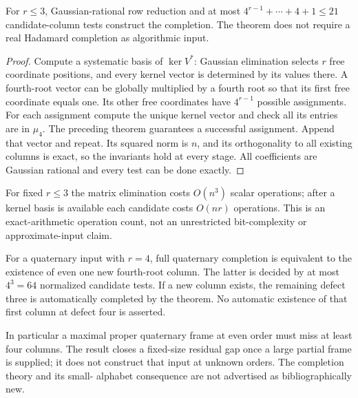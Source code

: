 \begin{theorem}
For $r\le3$, Gaussian-rational row reduction and at most
$4^{r-1}+\cdots+4+1\le21$ candidate-column tests construct the
completion. The theorem does not require a real Hadamard completion
as algorithmic input.
\end{theorem}
\begin{proof}
Compute a systematic basis of $\ker V^*$: Gaussian elimination
selects $r$ free coordinate positions, and every kernel vector is
determined by its values there. A fourth-root vector can be globally
multiplied by a fourth root so that its first free coordinate equals
one. Its other free coordinates have $4^{r-1}$ possible assignments.
For each assignment compute the unique kernel vector and check all
its entries are in $\mu_4$. The preceding theorem guarantees a
successful assignment. Append that vector and repeat. Its squared
norm is $n$, and its orthogonality to all existing columns is exact,
so the invariants hold at every stage. All coefficients are Gaussian
rational and every test can be done exactly.
\end{proof}
For fixed $r\le3$ the matrix elimination costs $O(n^3)$ scalar
operations; after a kernel basis is available each candidate costs
$O(nr)$ operations. This is an exact-arithmetic operation count,
not an unrestricted bit-complexity or approximate-input claim.

\begin{corollary}
For a quaternary input with $r=4$, full quaternary completion is
equivalent to the existence of even one new fourth-root column.
The latter is decided by at most $4^3=64$ normalized candidate tests.
If a new column exists, the remaining defect three is automatically
completed by the theorem. No automatic existence of that first
column at defect four is asserted.
\end{corollary}
In particular a maximal proper quaternary frame at even order must
miss at least four columns. The result closes a fixed-size residual
gap once a large partial frame is supplied; it does not construct
that input at unknown orders. The completion theory and its small-
alphabet consequence are not advertised as bibliographically new.
